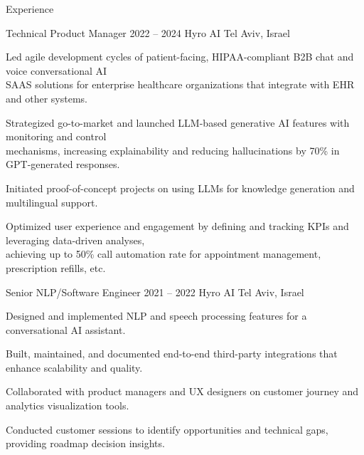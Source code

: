 \documentclass{resume} %
\begin{document}
\begin{rSection}{Experience}

\begin{rSubsection}
	{Technical Product Manager}
	{2022 -- 2024}
	{Hyro AI}
	{Tel Aviv, Israel}

	\setlength{\itemindent}{.5cm}
	
	
	
	\item Led agile development cycles of patient-facing, HIPAA-compliant B2B chat and voice conversational AI\\\hspace*{.5cm}SAAS solutions for enterprise healthcare organizations that integrate with EHR and other systems.
	\item Strategized go-to-market and launched LLM-based generative AI features with monitoring and control\\\hspace*{.5cm}mechanisms, increasing explainability and reducing hallucinations by 70\% in GPT-generated responses.
	\item Initiated proof-of-concept projects on using LLMs for knowledge generation and multilingual support.
	\item Optimized user experience and engagement by defining and tracking KPIs and leveraging data-driven analyses,\\\hspace*{.5cm}achieving up to 50\% call automation rate for appointment management, prescription refills, etc.
\end{rSubsection}

\begin{rSubsection}
	{Senior NLP/Software Engineer}
	{2021 -- 2022}
	{Hyro AI}
	{Tel Aviv, Israel}
	
	\setlength{\itemindent}{.5cm}
	
	\item Designed and implemented NLP and speech processing features for a conversational AI assistant.
	\item Built, maintained, and documented end-to-end third-party integrations that enhance scalability and quality.
	\item Collaborated with product managers and UX designers on customer journey and analytics visualization tools.
	\item Conducted customer sessions to identify opportunities and technical gaps, providing roadmap decision insights.
\end{rSubsection}


\end{rSection}
\end{document}
